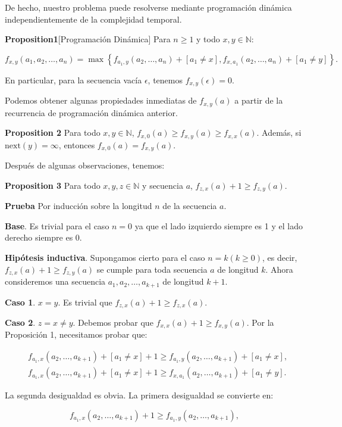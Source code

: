 \documentclass{article}
\begin{document}
De hecho, nuestro problema puede resolverse mediante programación dinámica independientemente de la complejidad temporal.

\textbf{Proposition1}[Programación Dinámica]
Para $n \geq 1$ y todo $x,y \in \mathbb{N}$:

$$
f_{x,y}(a_1, a_2, \ldots, a_n) = \max \left\{f_{a_1,y}(a_2, \ldots, a_n) + [a_1 \neq x], f_{x,a_1}(a_2, \ldots, a_n) + [a_1 \neq y] \right\}.
$$


En particular, para la secuencia vacía $\epsilon$, tenemos $f_{x,y}(\epsilon) = 0$.


Podemos obtener algunas propiedades inmediatas de $f_{x,y}(a)$ a partir de la recurrencia de programación dinámica anterior.

\textbf{Proposition 2}
Para todo $x,y \in \mathbb{N}$, $f_{x,0}(a) \geq f_{x,y}(a) \geq f_{x,x}(a)$. Además, si $\text{next}(y) = \infty$, entonces $f_{x,0}(a) = f_{x,y}(a)$.

Después de algunas observaciones, tenemos:

\textbf{Proposition 3}
Para todo $x,y,z \in \mathbb{N}$ y secuencia $a$, $f_{z,x}(a) + 1 \geq f_{z,y}(a)$.

\textbf{Prueba}
Por inducción sobre la longitud $n$ de la secuencia $a$.

\textbf{Base}. Es trivial para el caso $n = 0$ ya que el lado izquierdo siempre es 1 y el lado derecho siempre es 0.

\textbf{Hipótesis inductiva}. Supongamos cierto para el caso $n = k (k \geq 0)$, es decir, $f_{z,x}(a) + 1 \geq f_{z,y}(a)$ se cumple para toda secuencia $a$ de longitud $k$. Ahora consideremos una secuencia $a_1, a_2, \ldots, a_{k+1}$ de longitud $k+1$.

\textbf{Caso 1}. $x = y$. Es trivial que $f_{z,x}(a) + 1 \geq f_{z,x}(a)$.

\textbf{Caso 2}. $z = x \neq y$. Debemos probar que $f_{x,x}(a) + 1 \geq f_{x,y}(a)$. Por la Proposición 1, necesitamos probar que:

\begin{align*}
&f_{a_1,x}(a_2, \ldots, a_{k+1}) + [a_1 \neq x] + 1 \geq f_{a_1,y}(a_2, \ldots, a_{k+1}) + [a_1 \neq x], \\
&f_{a_1,x}(a_2, \ldots, a_{k+1}) + [a_1 \neq x] + 1 \geq f_{x,a_1}(a_2, \ldots, a_{k+1}) + [a_1 \neq y].
\end{align*}

La segunda desigualdad es obvia. La primera desigualdad se convierte en:

$$
f_{a_1,x}(a_2, \ldots, a_{k+1}) + 1 \geq f_{a_1,y}(a_2, \ldots, a_{k+1}),
$$
\end{document}
